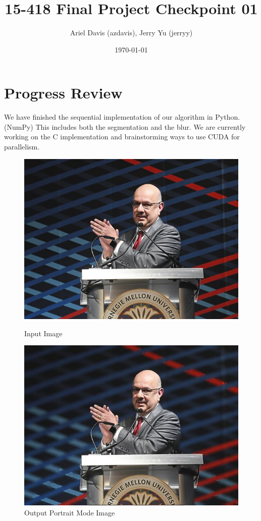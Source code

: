 \documentclass[12pt]{article}
\author{Ariel Davis (azdavis), Jerry Yu (jerryy)}
\date{\today}
\title{15-418 Final Project Checkpoint 01}
\begin{document}
\maketitle

\section*{Progress Review}
We have finished the sequential implementation of our algorithm in Python.
(NumPy)
This includes both the segmentation and the blur.
We are currently working on the C implementation and brainstorming ways to use
CUDA for parallelism.

\begin{figure}[!htb]
    \begin{minipage}{0.48\textwidth}
        \centering
        \includegraphics[width=0.9\linewidth]{farnam.jpg}
        \caption{Input Image}
    \end{minipage}\hfill
    \begin{minipage}{0.48\textwidth}
        \centering
        \includegraphics[width=0.9\linewidth]{farnam_portrait.jpg}
        \caption{Output Portrait Mode Image}
    \end{minipage}\hfill
\end{figure}
\end{document}
